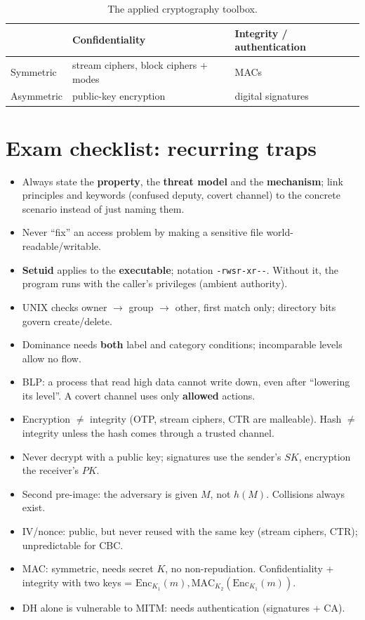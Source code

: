\begin{table}[h]
\centering
\begin{tabular}{@{}lll@{}}
\toprule
 & \textbf{Confidentiality} & \textbf{Integrity / authentication} \\
\midrule
Symmetric & stream ciphers, block ciphers + modes & MACs \\
Asymmetric & public-key encryption & digital signatures \\
\bottomrule
\end{tabular}
\caption{The applied cryptography toolbox.}
\end{table}

\section{Exam checklist: recurring traps}

\begin{itemize}
    \item Always state the \textbf{property}, the \textbf{threat model} and the \textbf{mechanism}; link principles and keywords (confused deputy, covert channel) to the concrete scenario instead of just naming them.
    \item Never ``fix'' an access problem by making a sensitive file world-readable/writable.
    \item \textbf{Setuid} applies to the \textbf{executable}; notation \texttt{-rwsr-xr-{}-}. Without it, the program runs with the caller's privileges (ambient authority).
    \item UNIX checks owner $\to$ group $\to$ other, first match only; directory bits govern create/delete.
    \item Dominance needs \textbf{both} label and category conditions; incomparable levels allow no flow.
    \item BLP: a process that read high data cannot write down, even after ``lowering its level''. A covert channel uses only \textbf{allowed} actions.
    \item Encryption $\neq$ integrity (OTP, stream ciphers, CTR are malleable). Hash $\neq$ integrity unless the hash comes through a trusted channel.
    \item Never decrypt with a public key; signatures use the sender's $SK$, encryption the receiver's $PK$.
    \item Second pre-image: the adversary is given $M$, not $h(M)$. Collisions always exist.
    \item IV/nonce: public, but never reused with the same key (stream ciphers, CTR); unpredictable for CBC.
    \item MAC: symmetric, needs secret $K$, no non-repudiation. Confidentiality + integrity with two keys = $\mathrm{Enc}_{K_1}(m), \mathrm{MAC}_{K_2}(\mathrm{Enc}_{K_1}(m))$.
    \item DH alone is vulnerable to MITM: needs authentication (signatures + CA).
\end{itemize}
